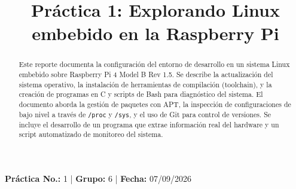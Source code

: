 \documentclass[conference]{IEEEtran}
\begin{document}
\title{Práctica 1: Explorando Linux embebido en la Raspberry Pi}

\author{
	\and
	\and
	\and
	\and
	\and
}

\maketitle

\begin{center}
	\vspace{-0.3cm}
	{\small
		\textbf{Práctica No.:} 1 \quad | \quad
		\textbf{Grupo:} 6 \quad | \quad
		\textbf{Fecha:} 07/09/2026
	}
	\vspace{0.2cm}
\end{center}

\begin{abstract}
	Este reporte documenta la configuración del entorno de desarrollo en un sistema Linux embebido sobre Raspberry Pi 4 Model B Rev 1.5. Se describe la actualización del sistema operativo, la instalación de herramientas de compilación (toolchain), y la creación de programas en C y scripts de Bash para diagnóstico del sistema. El documento aborda la gestión de paquetes con APT, la inspección de configuraciones de bajo nivel a través de \texttt{/proc} y \texttt{/sys}, y el uso de Git para control de versiones. Se incluye el desarrollo de un programa que extrae información real del hardware y un script automatizado de monitoreo del sistema.
\end{abstract}
\end{document}
